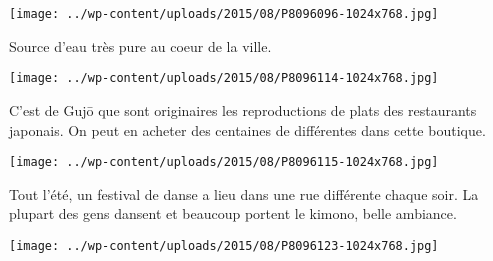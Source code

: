 \centerline{\texttt{[image: ../wp-content/uploads/2015/08/P8096096-1024x768.jpg]} } 
 \newline
 Source d'eau très pure au coeur de la ville. \newline
 \newline
\centerline{\texttt{[image: ../wp-content/uploads/2015/08/P8096114-1024x768.jpg]} } 
 \newline
 C'est de Gujō que sont originaires les reproductions de plats des restaurants japonais. On peut en acheter des centaines de différentes dans cette boutique. \newline
 \newline
\centerline{\texttt{[image: ../wp-content/uploads/2015/08/P8096115-1024x768.jpg]} } 
 \newline
 Tout l'été, un festival de danse a lieu dans une rue différente chaque soir. La plupart des gens dansent et beaucoup portent le kimono, belle ambiance. \newline
 \newline
\centerline{\texttt{[image: ../wp-content/uploads/2015/08/P8096123-1024x768.jpg]} } 
 \newline

\newpage
 
